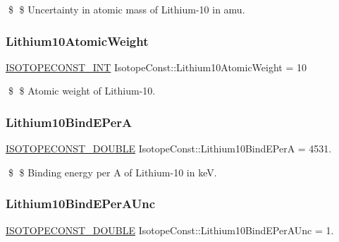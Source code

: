 \$ \$ Uncertainty in atomic mass of Lithium-\/10 in amu. \mbox{\label{group___isotope_const-_lithium-_li10_ga06d7751c3b51e3fcc3a10ce264bd3314}} 
\subsubsection{\texorpdfstring{Lithium10\+Atomic\+Weight}{Lithium10AtomicWeight}}
{\footnotesize\ttfamily \mbox{\hyperlink{group___isotope_const-_macros_ga5f18360b3e99483a35c32d789e62621c}{I\+S\+O\+T\+O\+P\+E\+C\+O\+N\+S\+T\+\_\+\+I\+NT}} Isotope\+Const\+::\+Lithium10\+Atomic\+Weight = 10}

\$ \$ Atomic weight of Lithium-\/10. \mbox{\label{group___isotope_const-_lithium-_li10_gae5600ca166e3a0df4f189933a74db86d}} 
\subsubsection{\texorpdfstring{Lithium10\+Bind\+E\+PerA}{Lithium10BindEPerA}}
{\footnotesize\ttfamily \mbox{\hyperlink{group___isotope_const-_macros_ga8f45a7272ce02c0b4c65c44636ed719a}{I\+S\+O\+T\+O\+P\+E\+C\+O\+N\+S\+T\+\_\+\+D\+O\+U\+B\+LE}} Isotope\+Const\+::\+Lithium10\+Bind\+E\+PerA = 4531.}

\$ \$ Binding energy per A of Lithium-\/10 in keV. \mbox{\label{group___isotope_const-_lithium-_li10_ga2f481709ad756110227c9c5a5f0a1c2e}} 
\subsubsection{\texorpdfstring{Lithium10\+Bind\+E\+Per\+A\+Unc}{Lithium10BindEPerAUnc}}
{\footnotesize\ttfamily \mbox{\hyperlink{group___isotope_const-_macros_ga8f45a7272ce02c0b4c65c44636ed719a}{I\+S\+O\+T\+O\+P\+E\+C\+O\+N\+S\+T\+\_\+\+D\+O\+U\+B\+LE}} Isotope\+Const\+::\+Lithium10\+Bind\+E\+Per\+A\+Unc = 1.}

